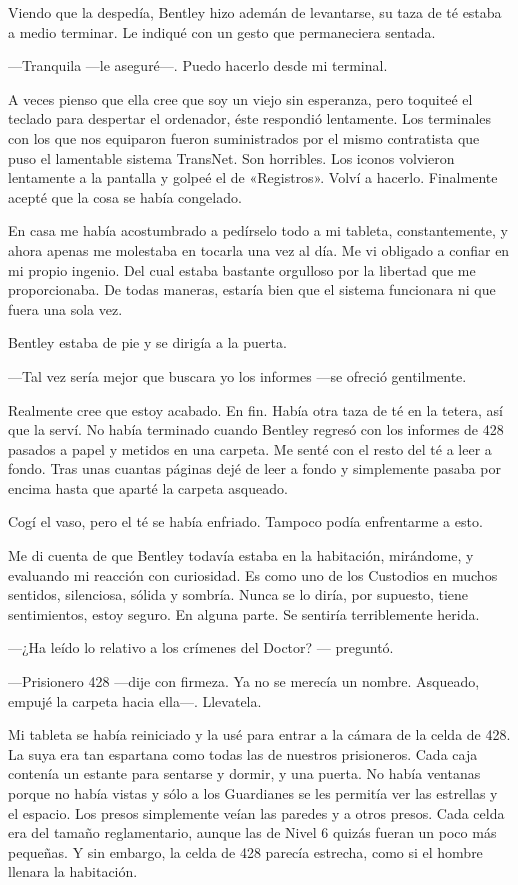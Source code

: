 Viendo que la despedía, Bentley hizo ademán de levantarse, su taza de té
estaba a medio terminar. Le indiqué con un gesto que permaneciera
sentada.

---Tranquila ---le aseguré---. Puedo hacerlo desde mi terminal.

A veces pienso que ella cree que soy un viejo sin esperanza, pero
toquiteé el teclado para despertar el ordenador, éste respondió
lentamente. Los terminales con los que nos equiparon fueron
suministrados por el mismo contratista que puso el lamentable sistema
TransNet. Son horribles. Los iconos volvieron lentamente a la pantalla y
golpeé el de «Registros». Volví a hacerlo. Finalmente acepté que la cosa
se había congelado.

En casa me había acostumbrado a pedírselo todo a mi tableta,
constantemente, y ahora apenas me molestaba en tocarla una vez al día.
Me vi obligado a confiar en mi propio ingenio. Del cual estaba bastante
orgulloso por la libertad que me proporcionaba. De todas maneras,
estaría bien que el sistema funcionara ni que fuera una sola vez.

Bentley estaba de pie y se dirigía a la puerta.

---Tal vez sería mejor que buscara yo los informes ---se ofreció
gentilmente.

Realmente cree que estoy acabado. En fin. Había otra taza de té en la
tetera, así que la serví. No había terminado cuando Bentley regresó con
los informes de 428 pasados a papel y metidos en una carpeta. Me senté
con el resto del té a leer a fondo. Tras unas cuantas páginas dejé de
leer a fondo y simplemente pasaba por encima hasta que aparté la carpeta
asqueado.

Cogí el vaso, pero el té se había enfriado. Tampoco podía enfrentarme a
esto.

Me di cuenta de que Bentley todavía estaba en la habitación, mirándome,
y evaluando mi reacción con curiosidad. Es como uno de los Custodios en
muchos sentidos, silenciosa, sólida y sombría. Nunca se lo diría, por
supuesto, tiene sentimientos, estoy seguro. En alguna parte. Se sentiría
terriblemente herida.

---¿Ha leído lo relativo a los crímenes del Doctor? --- preguntó.

---Prisionero 428 ---dije con firmeza. Ya no se merecía un nombre.
Asqueado, empujé la carpeta hacia ella---. Llevatela.

Mi tableta se había reiniciado y la usé para entrar a la cámara de la
celda de 428. La suya era tan espartana como todas las de nuestros
prisioneros. Cada caja contenía un estante para sentarse y dormir, y una
puerta. No había ventanas porque no había vistas y sólo a los Guardianes
se les permitía ver las estrellas y el espacio. Los presos simplemente
veían las paredes y a otros presos. Cada celda era del tamaño
reglamentario, aunque las de Nivel 6 quizás fueran un poco más pequeñas.
Y sin embargo, la celda de 428 parecía estrecha, como si el hombre
llenara la habitación.

